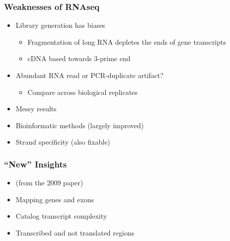 \documentclass[14pt]{beamer}
\begin{document}
\begin{frame}
\frametitle{Weaknesses of RNAseq}
	\begin{itemize}
		\item<+-> Library generation has biases
		\begin{itemize}
			\item<+-> Fragmentation of long RNA depletes the ends of gene transcripts
			\item<+-> cDNA based towards 3-prime end
		\end{itemize}
		\item<+-> Abundant RNA read or PCR-duplicate artifact?
		\begin{itemize}
			\item<+-> Compare across biological replicates
		\end{itemize}
		\item<+-> Messy results
		\item<+-> Bioinformatic methods (largely improved)
		\item<+-> Strand specificity (also fixable) 
	\end{itemize}
\end{frame}

\begin{frame}
\frametitle{``New'' Insights}
	\begin{itemize}
		\footnotesize
		\item[] (from the 2009 paper)
		\normalsize
		\item<+-> Mapping genes and exons
		\item<+-> Catalog transcript complexity
		\item<+-> Transcribed and not translated regions
	\end{itemize}
\end{frame}
\end{document}
